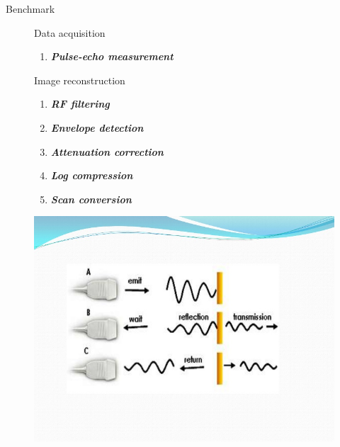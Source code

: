 \documentclass[t,12pt,english
\ifx\beamermode\undefined\else,\beamermode\fi
]{beamer}
\begin{document}
\begin{frame}{Benchmark}


\begin{figure}[!htb]

\begin{block}{\footnotesize{Data acquisition}}\tiny{}
\begin{enumerate} 
\vspace{0.05cm}
     \color{red}
     \item \tiny{\textbf{\textit{Pulse-echo measurement}}}
\end{enumerate}
\end{block}

\begin{block}{\footnotesize{Image reconstruction}}\tiny{}
\begin{enumerate} 
\vspace{0.05cm}
     \item \tiny{\textbf{\textit{RF filtering}}}
     \item \tiny{\textbf{\textit{Envelope detection}}}
     \item \tiny{\textbf{\textit{Attenuation correction}}}
     \item \tiny{\textbf{\textit{Log compression}}}
     \item \tiny{\textbf{\textit{Scan conversion}}}
\end{enumerate}
\end{block}

\endminipage
{}
\centering

\includegraphics[width=.51\textwidth]{18.jpg}

\endminipage
\end{figure}

\end{frame}
\end{document}
